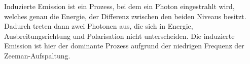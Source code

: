 Induzierte Emission ist ein Prozess, bei dem ein Photon eingestrahlt wird, welches genau die Energie, der Differenz zwischen den beiden Niveaus besitzt. Dadurch treten dann zwei Photonen aus, die sich in Energie, Ausbreitungsrichtung und Polarisation nicht unterscheiden. 
Die induzierte Emission ist hier der dominante Prozess aufgrund der niedrigen Frequenz der Zeeman-Aufspaltung. 










